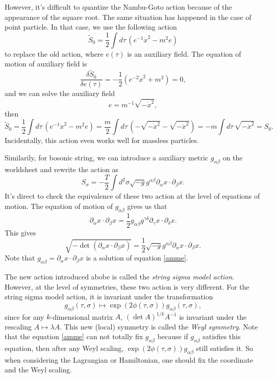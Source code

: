 However, it's difficult to quantize the Nambu-Goto action 
because of the appearance of the square root. The same situation
has happened in the case of point particle. In that case, we use the 
following action
\[
	\tilde S_0=\frac{1}{2} \int d\tau\, (e^{-1}\dot x^2-m^2 e)
\]
to replace the old action, where $e(\tau)$ is an auxiliary field.
The equation of motion of auxiliary field is 
\[
	\frac{\delta \tilde S_0}{\delta e(\tau)}=
	-\frac{1}{2}(e^{-2}\dot x^2+m^2)=0,
\]
and we can solve the auxiliary field
\[
	e=m^{-1}\sqrt{-\dot x^2},
\]
then
\[
	\tilde S_0=\frac{1}{2} \int d\tau\, (e^{-1}\dot x^2-m^2 e)
	=\frac{m}{2}\int d\tau\, (-\sqrt{-\dot x^2}-\sqrt{-\dot x^2})
	=-m\int d\tau\, \sqrt{-\dot x^2}=S_0.
\]
Incidentally, this action even works well for massless particles.

Similarily, for bosonic string, we can introduce a auxiliary metric 
$g_{\alpha\beta}$ on the worldsheet and rewrite the action as
\[
	S_\sigma=-\frac{T}{2} \int d^2\sigma \sqrt{-g}
	g^{\alpha\beta}\partial_\alpha x\cdot \partial_\beta x.
\]
It's direct to check the equivalence of these two action
at the level of equations of motion. The equation of motion of
$g_{\alpha\beta}$ gives us that
\begin{equation}\label{amme}
	\partial_\alpha x\cdot \partial_\beta x
	=\frac{1}{2}g_{\alpha\beta}g^{\gamma\delta}
	\partial_\gamma x\cdot \partial_\delta x.
\end{equation}
This gives
\[
	\sqrt{-\det(\partial_\alpha x\cdot \partial_\beta x)}
	=\frac{1}{2}\sqrt{-g}g^{\alpha\beta}
	\partial_\alpha x\cdot \partial_\beta x.
\]
Note that $g_{\alpha\beta}=\partial_\alpha x\cdot \partial_\beta x$
is a solution of equation \eqref{amme}.

The new action introduced abobe is called 
the \textit{string sigma model action}. However,
at the level of symmetries, these two action is very different.
For the string sigma model action, it is invariant under the 
transformation 
\[
	g_{\alpha\beta}(\tau,\sigma)\longmapsto
	\exp(2\phi(\tau,\sigma))g_{\alpha\beta}(\tau,\sigma),
\]
since for any $k$-dimensional matrix $A$, 
$(\det A)^{1/k} A^{-1}$ is invariant under the rescaling 
$A\mapsto \lambda A$. This new (local) symmetry is called 
the \textit{Weyl symmetry}. Note that the equation 
\eqref{amme} can not totally fix $g_{\alpha\beta}$ because
if $g_{\alpha\beta}$ satisfies this equation, then after
any Weyl scaling, $\exp(2\phi(\tau,\sigma))g_{\alpha\beta}$
still satisfies it. So when considering the Lagrangian or
Hamiltonian, one should fix the coordinate and the Weyl
scaling.

